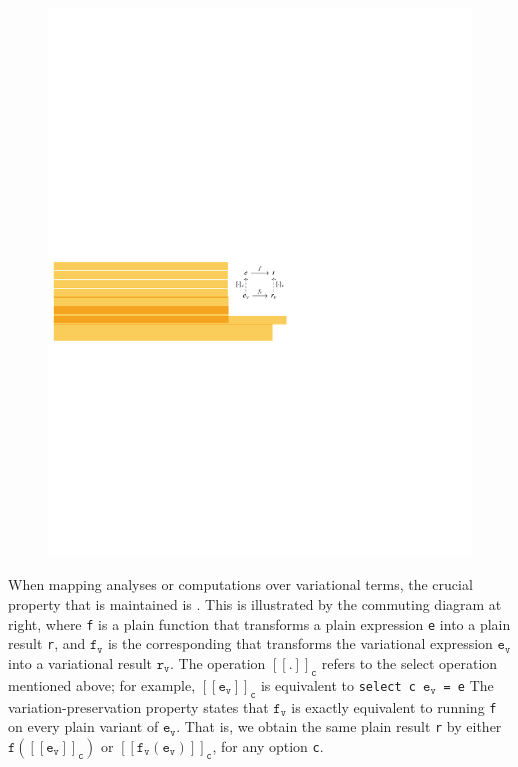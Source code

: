 \begin{figure}
\includegraphics[width=0.9\linewidth]{figures/diagram.pdf} 
\end{figure}

When mapping analyses or computations over variational terms, the crucial property
that is maintained is  \cite{CEW16ecoop}. This is illustrated by the commuting
diagram at right, where \texttt{f} is a plain function that transforms a plain expression \texttt{e} into a plain result \texttt{r}, and $\texttt{f}_\texttt{v}$ is the corresponding  that transforms the variational expression $\texttt{e}_\texttt{v}$ into a variational result $\texttt{r}_\texttt{v}$. The operation $[\![.]\!]_{\texttt{c}}$ refers to the select operation mentioned above; for example, $[\![\texttt{e}_\texttt{v}]\!]_{\texttt{c}}$ is equivalent to \texttt{select c $\texttt{e}_\texttt{v}$ = e}
The variation-preservation property states that $\texttt{f}_\texttt{v}$ is exactly equivalent to running \texttt{f} on every plain variant of $\texttt{e}_\texttt{v}$. That is, we obtain the same plain result \texttt{r} by either $\texttt{f}([\![\texttt{e}_\texttt{v}]\!]_{\texttt{c}})$ or $[\![\texttt{f}_\texttt{v}(\texttt{e}_\texttt{v})]\!]_{\texttt{c}}$, for any option \texttt{c}.

